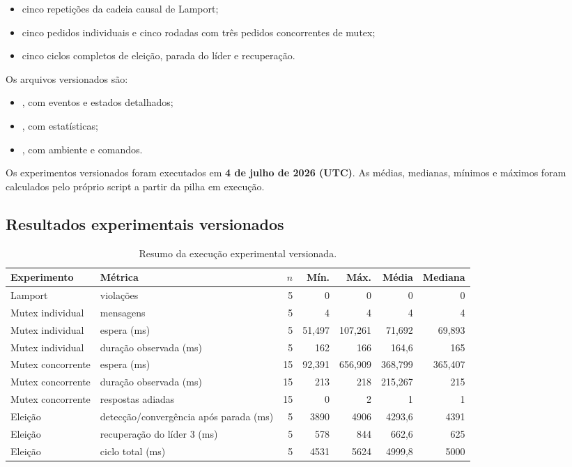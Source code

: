 \begin{itemize}
    \item cinco repetições da cadeia causal de Lamport;
    \item cinco pedidos individuais e cinco rodadas com três pedidos concorrentes de mutex;
    \item cinco ciclos completos de eleição, parada do líder e recuperação.
\end{itemize}

Os arquivos versionados são:

\begin{itemize}
    \item {}, com eventos e estados detalhados;
    \item {}, com estatísticas;
    \item {}, com ambiente e comandos.
\end{itemize}

Os experimentos versionados foram executados em \textbf{4 de julho de 2026 (UTC)}. As médias, medianas, mínimos e máximos foram calculados pelo próprio script a partir da pilha em execução.

\subsection{Resultados experimentais versionados}

\begin{table}[H]
    \centering
    \scriptsize
    \begin{tabularx}{\textwidth}{@{}p{2.7cm}p{3.1cm}r r r r r@{}}
        \toprule
        Experimento & Métrica & $n$ & Mín. & Máx. & Média & Mediana \\
        \midrule
        Lamport & violações & 5 & 0 & 0 & 0 & 0 \\
        Mutex individual & mensagens & 5 & 4 & 4 & 4 & 4 \\
        Mutex individual & espera (ms) & 5 & 51,497 & 107,261 & 71,692 & 69,893 \\
        Mutex individual & duração observada (ms) & 5 & 162 & 166 & 164,6 & 165 \\
        Mutex concorrente & espera (ms) & 15 & 92,391 & 656,909 & 368,799 & 365,407 \\
        Mutex concorrente & duração observada (ms) & 15 & 213 & 218 & 215,267 & 215 \\
        Mutex concorrente & respostas adiadas & 15 & 0 & 2 & 1 & 1 \\
        Eleição & detecção/convergência após parada (ms) & 5 & 3890 & 4906 & 4293,6 & 4391 \\
        Eleição & recuperação do líder 3 (ms) & 5 & 578 & 844 & 662,6 & 625 \\
        Eleição & ciclo total (ms) & 5 & 4531 & 5624 & 4999,8 & 5000 \\
        \bottomrule
    \end{tabularx}
    \caption{Resumo da execução experimental versionada.}
    \label{tab:results}
\end{table}

